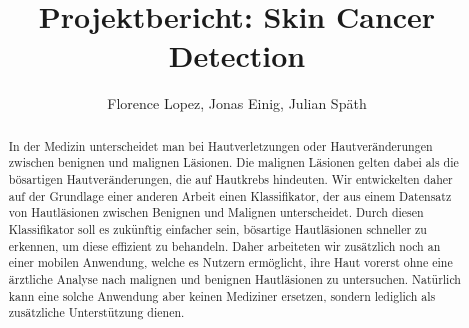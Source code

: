 \documentclass[a4paper, doc]{apa6}
\title{Projektbericht: Skin Cancer Detection}
\author{Florence Lopez, Jonas Einig, Julian Späth }
\affiliation{Department of Computer Science, University of Tübingen}
\begin{document}
\maketitle
\begin{abstract}
In der Medizin unterscheidet man bei Hautverletzungen oder Hautveränderungen zwischen benignen und malignen Läsionen. Die malignen Läsionen gelten dabei als die bösartigen Hautveränderungen, die auf Hautkrebs hindeuten. Wir entwickelten daher auf der Grundlage einer anderen Arbeit einen Klassifikator, der aus einem Datensatz von Hautläsionen zwischen Benignen und Malignen unterscheidet. Durch diesen Klassifikator soll es zukünftig einfacher sein, bösartige Hautläsionen schneller zu erkennen, um diese effizient zu behandeln. Daher arbeiteten wir zusätzlich noch an einer mobilen Anwendung, welche es Nutzern ermöglicht, ihre Haut vorerst ohne eine ärztliche Analyse nach malignen und benignen Hautläsionen zu untersuchen. Natürlich kann eine solche Anwendung aber keinen Mediziner ersetzen, sondern lediglich als zusätzliche Unterstützung dienen. 
\end{abstract}
    








\end{document}
